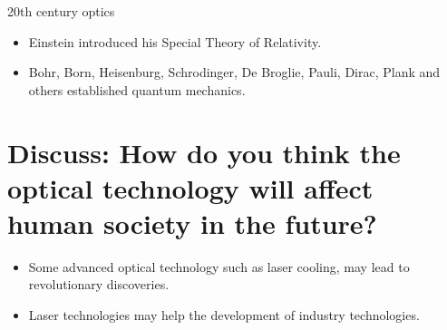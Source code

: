 \documentclass{article}
\begin{document}
20th century optics
\begin{itemize}
\item Einstein introduced his Special Theory of Relativity.
  \item Bohr, Born, Heisenburg, Schrodinger, De Broglie, Pauli, Dirac, Plank and others established quantum mechanics.
\end{itemize}

\section{Discuss: How do you think the optical technology will affect human society in the future?}

\begin{itemize}
\item Some advanced optical technology such as laser cooling, may lead to revolutionary discoveries.
\item Laser technologies may help the development of industry technologies.
\end{itemize}
\end{document}
